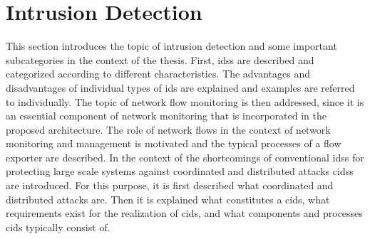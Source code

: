 \documentclass[../../../main.tex]{subfiles}
\begin{document}
\section{Intrusion Detection}

This section introduces the topic of intrusion detection and some important subcategories in the context of the thesis. First, \glspl{ids} are described and categorized according to different characteristics. The advantages and disadvantages of individual types of \acrshort{ids} are explained and examples are referred to individually. The topic of network flow monitoring is then addressed, since it is an essential component of network monitoring that is incorporated in the proposed architecture. The role of network flows in the context of network monitoring and management is motivated and the typical processes of a flow exporter are described. In the context of the shortcomings of conventional \glspl{ids} for protecting large scale systems against coordinated and distributed attacks \glspl{cids} are introduced. For this purpose, it is first described what coordinated and distributed attacks are. Then it is explained what constitutes a \gls{cids}, what requirements exist for the realization of \gls{cids}, and what components and processes \acrshort{cids} typically consist of.






\end{document}
